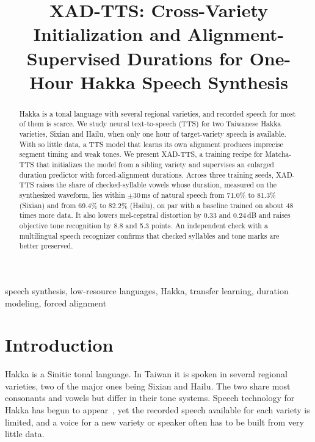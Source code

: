 \documentclass[conference,a4paper]{IEEEtran}
\begin{document}
\title{XAD-TTS: Cross-Variety Initialization and Alignment-Supervised Durations for One-Hour Hakka Speech Synthesis}

\author{
}

\maketitle

\begin{abstract}
Hakka is a tonal language with several regional varieties, and recorded speech for most of them is scarce. We study neural text-to-speech (TTS) for two Taiwanese Hakka varieties, Sixian and Hailu, when only one hour of target-variety speech is available. With so little data, a TTS model that learns its own alignment produces imprecise segment timing and weak tones. We present XAD-TTS, a training recipe for Matcha-TTS that initializes the model from a sibling variety and supervises an enlarged duration predictor with forced-alignment durations. Across three training seeds, XAD-TTS raises the share of checked-syllable vowels whose duration, measured on the synthesized waveform, lies within $\pm$30\,ms of natural speech from 71.0\% to 81.3\% (Sixian) and from 69.4\% to 82.2\% (Hailu), on par with a baseline trained on about 48 times more data. It also lowers mel-cepstral distortion by 0.33 and 0.24\,dB and raises objective tone recognition by 8.8 and 5.3 points. An independent check with a multilingual speech recognizer confirms that checked syllables and tone marks are better preserved.
\end{abstract}

\begin{IEEEkeywords}
speech synthesis, low-resource languages, Hakka, transfer learning, duration modeling, forced alignment
\end{IEEEkeywords}

\section{Introduction}

Hakka is a Sinitic tonal language. In Taiwan it is spoken in several regional varieties, two of the major ones being Sixian and Hailu. The two share most consonants and vowels but differ in their tone systems. Speech technology for Hakka has begun to appear~\cite{chen2024voxhakka}, yet the recorded speech available for each variety is limited, and a voice for a new variety or speaker often has to be built from very little data.
\end{document}
